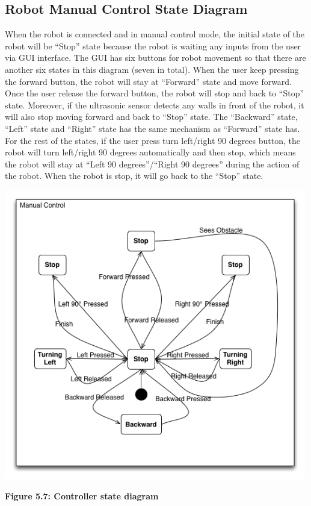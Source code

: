 \documentclass[11pt, a4paper]{report}
\begin{document}
\subsection{  Robot Manual Control State Diagram}
When the robot is connected and in manual control mode, the initial state of the robot will be ``Stop'' state because the robot is waiting any inputs from the user via GUI interface. The GUI has six buttons for robot movement so that there are another six states in this diagram (seven in total).  When the user keep pressing the forward button, the robot will stay at ``Forward'' state and move forward. Once the user release the forward button, the robot will stop and back to ``Stop'' state. Moreover, if the ultrasonic sensor detects any walls in front of the robot, it will also stop moving forward and back to ``Stop'' state. The ``Backward'' state, ``Left'' state and ``Right'' state has the same mechanism as ``Forward'' state has. For the rest of the states, if the user press turn left/right 90 degrees button, the robot will turn left/right 90 degrees automatically and then stop, which means the robot will stay at ``Left 90 degrees''/``Right 90 degrees'' during the action of the robot. When the robot is stop, it will go back to the ``Stop'' state.
 \begin{center}
 \includegraphics[width=13.20cm]{RobotManualControl.png}
\end{center}
\begin{center}
\textbf {Figure 5.7: Controller state diagram} \\[0.3cm]
\end{center}
\pagebreak
\end{document}
